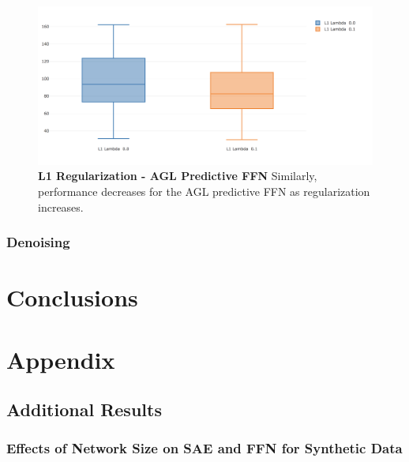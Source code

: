 \documentclass[a4paper,latin]{paper}
\begin{document}
\begin{figure}[H]
	\centering \includegraphics[scale=0.3]{images/iteration_five/it5_reg_ffn.png}
	\caption{\textbf{L1 Regularization - AGL Predictive FFN}
			\newline Similarly, performance decreases for the AGL predictive FFN as regularization increases.}
	\label{figure-results-it5_reg_ffn}
\end{figure}		


\subsubsection{Denoising}













\newpage
\section{Conclusions}\label{Conclusion}


\section{Appendix}\label{Appendix}

\subsection{Additional Results}

\subsubsection{Effects of Network Size on SAE and FFN for Synthetic Data}\label{appendix_sae_ffn_network_size}
\end{document}

